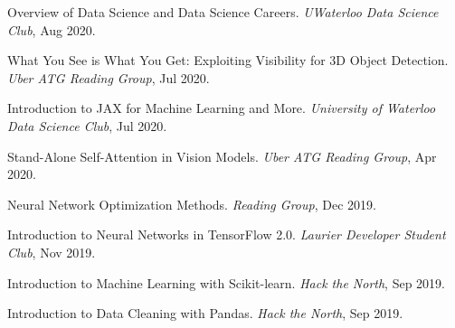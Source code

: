 \documentclass[line,margin]{res}
\newcommand{\talk}[4]{#1. \textit{#2}, #4. \vspace{-2mm}}
\begin{document}
\begin{resume}
    \talk
    {Overview of Data Science and Data Science Careers}
    {UWaterloo Data Science Club}{Waterloo}{Aug 2020}

    \talk
    {What You See is What You Get: Exploiting Visibility for 3D Object Detection}
    {Uber ATG Reading Group}{Toronto}{Jul 2020}

    \talk
    {Introduction to JAX for Machine Learning and More}
    {University of Waterloo Data Science Club}{Waterloo}{Jul 2020}

    \talk
    {Stand-Alone Self-Attention in Vision Models}
    {Uber ATG Reading Group}{Toronto}{Apr 2020}

    \talk
    {Neural Network Optimization Methods}
    {Reading Group}{Waterloo}{Dec 2019}

    \talk
    {Introduction to Neural Networks in TensorFlow 2.0}
    {Laurier Developer Student Club}{Waterloo}{Nov 2019}

    \talk
    {Introduction to Machine Learning with Scikit-learn}
    {Hack the North}{Waterloo}{Sep 2019}

    \talk
    {Introduction to Data Cleaning with Pandas}
    {Hack the North}{Waterloo}{Sep 2019}

\end{resume}
\end{document}
